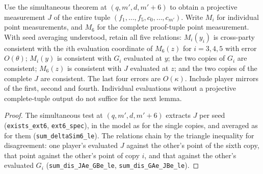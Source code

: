 \begin{lemma}
\label{lem:ar-simultaneous-proof}
\leanok
Use the simultaneous theorem at $(q,m',d,m'+6)$ to obtain a projective
measurement $J$ of the entire tuple $(f_1,\ldots,f_5,c_0,\ldots,c_{m'})$.
Write $M_i$ for individual point measurements, and $M_6$ for the complete
proof-tuple point measurement. With seed averaging understood, retain all
five relations: $M_i(y_i)$ is cross-party consistent with the $i$th
evaluation coordinate of $M_6(z)$ for $i=3,4,5$ with error $O(\theta)$;
$M_i(y)$ is consistent with $G_i$ evaluated at $y$; the two copies of $G_i$
are consistent; $M_6(z)$ is consistent with $J$ evaluated at $z$; and the
two copies of the complete $J$ are consistent. The last four errors are
$O(\kappa)$. Include player mirrors of the first, second and fourth.
Individual evaluations without a projective complete-tuple output do not
suffice for the next lemma.
\end{lemma}

\begin{proof}
\leanok
The simultaneous test at $(q,m',d,m'+6)$ extracts $J$ per seed (\texttt{exists\_ext6},
\texttt{ext6\_spec}), in the model as for the single copies, and averaged as for them
(\texttt{sum\_deltaSim6\_le}). The
relations chain by the triangle inequality for disagreement: one player's evaluated $J$ against
the other's point of the sixth copy, that point against the other's point of copy $i$, and that
against the other's evaluated $G_i$ (\texttt{sum\_dis\_JAe\_GBe\_le},
\texttt{sum\_dis\_GAe\_JBe\_le}).
\end{proof}


